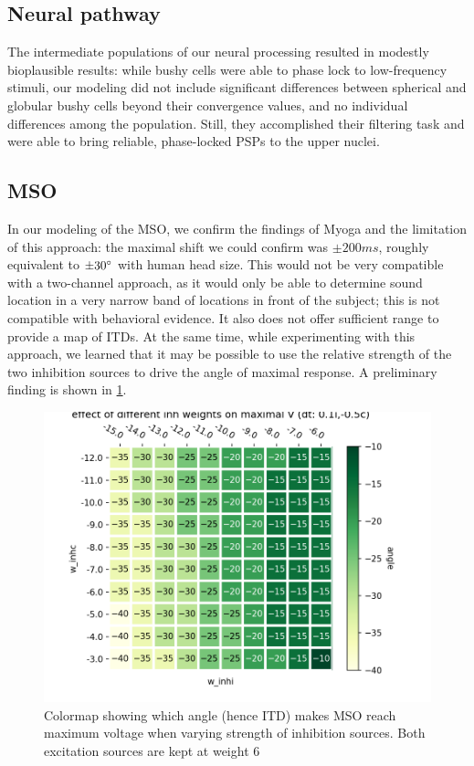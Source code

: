 \documentclass[11pt,a4paper]{article}
\begin{document}
\subsection{Neural pathway}
The intermediate populations of our neural processing resulted in modestly bioplausible results: while bushy cells were able to phase lock to low-frequency stimuli, our modeling did not include significant differences between spherical and globular bushy cells beyond their convergence values, and no individual differences among the population. Still, they accomplished their filtering task and were able to bring reliable, phase-locked PSPs to the upper nuclei.

\subsection{MSO}
In our modeling of the MSO, we confirm the findings of Myoga and the limitation of this approach: the maximal shift we could confirm was $\pm200ms$, roughly equivalent to $\pm30\degree$ with human head size. This would not be very compatible with a two-channel approach, as it would only be able to determine sound location in a very narrow band of locations in front of the subject; this is not compatible with behavioral evidence. It also does not offer sufficient range to provide a map of ITDs. At the same time, while experimenting with this approach, we learned that it may be possible to use the relative strength of the two inhibition sources to drive the angle of maximal response. A preliminary finding is shown in \ref{fig:myoga-vary-weight}.
\begin{figure}[H]
    \centering
    \includegraphics[width=0.5\linewidth]{Images/myoga_change_weights.png}
    \caption{Colormap showing which angle (hence ITD) makes MSO reach maximum voltage when varying strength of inhibition sources. Both excitation sources are kept at weight 6}
    \label{fig:myoga-vary-weight}
\end{figure}
\end{document}
